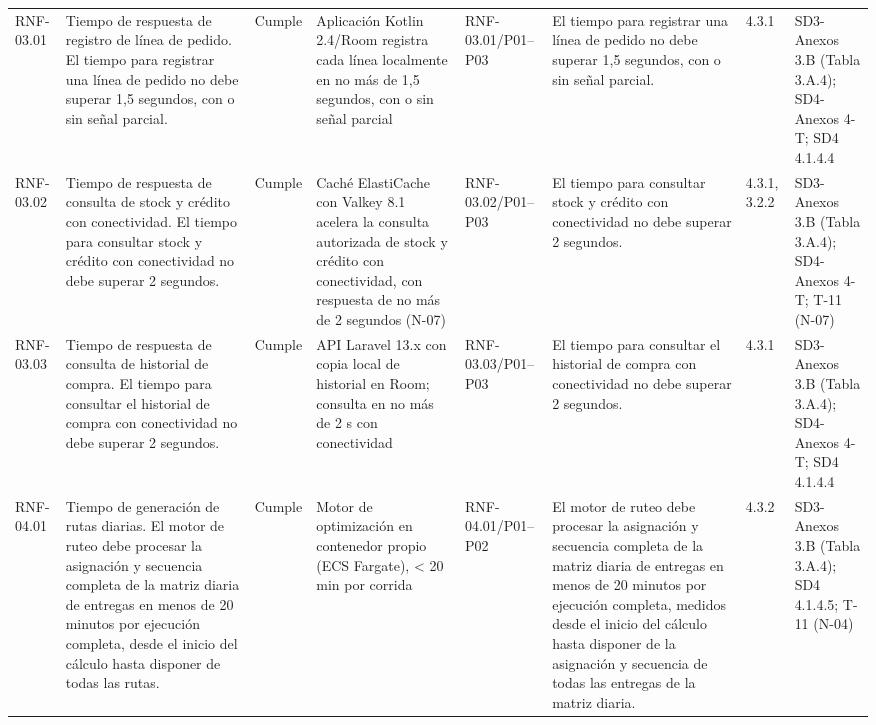 \documentclass[oficio,firma,final]{lafrox}
\begin{document}
\begin{landscape}
{\begin{longtable}{@{}F{0.054} F{0.173} F{0.061} F{0.191} F{0.106} F{0.180} F{0.067} F{0.168}@{}}
  RNF-03.01 & Tiempo de respuesta de registro de línea de pedido. El tiempo para registrar una línea de pedido no debe superar 1,5 segundos, con o sin señal parcial. & Cumple & Aplicación Kotlin 2.4/Room registra cada línea localmente en no más de 1,5 segundos, con o sin señal parcial & RNF-03.01/\allowbreak{}P01--\allowbreak{}P03 & El tiempo para registrar una línea de pedido no debe superar 1,5 segundos, con o sin señal parcial. & 4.3.1 & SD3-Anexos 3.B (Tabla 3.A.4); SD4-Anexos 4-T; SD4 4.1.4.4  \\
  RNF-03.02 & Tiempo de respuesta de consulta de stock y crédito con conectividad. El tiempo para consultar stock y crédito con conectividad no debe superar 2 segundos. & Cumple & Caché ElastiCache con Valkey 8.1 acelera la consulta autorizada de stock y crédito con conectividad, con respuesta de no más de 2 segundos (N-07) & RNF-03.02/\allowbreak{}P01--\allowbreak{}P03 & El tiempo para consultar stock y crédito con conectividad no debe superar 2 segundos. & 4.3.1, 3.2.2 & SD3-Anexos 3.B (Tabla 3.A.4); SD4-Anexos 4-T; T-11 (N-07)  \\
  RNF-03.03 & Tiempo de respuesta de consulta de historial de compra. El tiempo para consultar el historial de compra con conectividad no debe superar 2 segundos. & Cumple & API Laravel 13.x con copia local de historial en Room; consulta en no más de 2 s con conectividad & RNF-03.03/\allowbreak{}P01--\allowbreak{}P03 & El tiempo para consultar el historial de compra con conectividad no debe superar 2 segundos. & 4.3.1 & SD3-Anexos 3.B (Tabla 3.A.4); SD4-Anexos 4-T; SD4 4.1.4.4  \\
  RNF-04.01 & Tiempo de generación de rutas diarias. El motor de ruteo debe procesar la asignación y secuencia completa de la matriz diaria de entregas en menos de 20 minutos por ejecución completa, desde el inicio del cálculo hasta disponer de todas las rutas. & Cumple & Motor de optimización en contenedor propio (ECS Fargate), < 20 min por corrida & RNF-04.01/\allowbreak{}P01--\allowbreak{}P02 & El motor de ruteo debe procesar la asignación y secuencia completa de la matriz diaria de entregas en menos de 20 minutos por ejecución completa, medidos desde el inicio del cálculo hasta disponer de la asignación y secuencia de todas las entregas de la matriz diaria. & 4.3.2 & SD3-Anexos 3.B (Tabla 3.A.4); SD4 4.1.4.5; T-11 (N-04)  \\

\end{longtable}}
\end{landscape}
\end{document}
